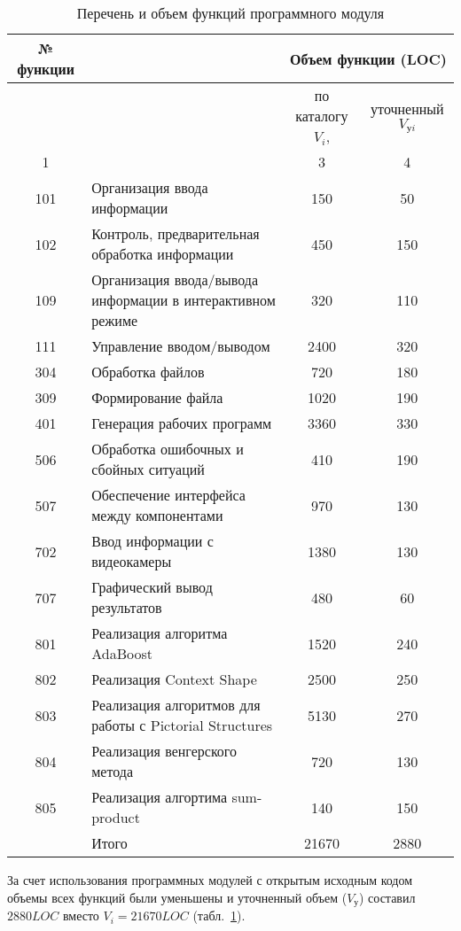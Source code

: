 \begin{table}[ht]\footnotesize
  \caption{Перечень и объем функций программного модуля}
  \label{function-list}
  \begin{tabularx}{\textwidth}{| c | X | c | c |}
    \hline
    № функции & \centering{Наименование (содержание)} & \multicolumn{2}{c|}{Объем функции (LOC)}\\
    \hline
    & & по каталогу \(V_i\), & уточненный \(V_{\text{у}i}\)\\
    \hline
    1 & \centering{2} & 3 & 4\\
    \hline
    101 & Организация ввода информации & 150 & 50\\
    102 & Контроль, предварительная обработка информации & 450 & 150\\
    109 & Организация ввода/вывода информации в интерактивном режиме & 320 & 110\\
    111 & Управление вводом/выводом & 2400 & 320\\
    \hline
    304 & Обработка файлов & 720 & 180\\
    309 & Формирование файла & 1020 & 190\\
    \hline
    401 & Генерация рабочих программ & 3360 & 330\\
    \hline
    506 & Обработка ошибочных и сбойных ситуаций & 410 & 190\\
    507 & Обеспечение интерфейса между компонентами & 970 & 130\\
    \hline
    702 & Ввод информации с видеокамеры & 1380 & 130\\
    707 & Графический вывод результатов & 480 & 60\\
    \hline
    801 & Реализация алгоритма AdaBoost & 1520 & 240\\
    802 & Реализация Context Shape & 2500 & 250\\
    803 & Реализация алгоритмов для работы с Pictorial Structures & 5130 & 270\\
    804 & Реализация венгерского метода & 720 & 130\\
    805 & Реализация алгортима sum-product & 140 & 150\\
    \hline
    & Итого & 21670 & 2880\\
    \hline
  \end{tabularx}
\end{table}

За счет использования программных модулей с открытым исходным кодом объемы всех функций были уменьшены и уточненный объем (\( V_{\text{у}} \)) составил \( 2880 LOC \) вместо \( V_i = 21670 LOC \) (табл.~\ref{function-list}).

